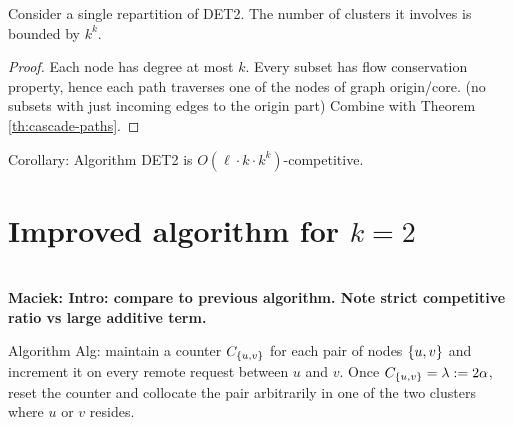 \documentclass[manuscript,screen=true, review, anonymous]{acmart}
\DeclarePairedDelimiter\set{\{}{\}}
\newcommand\maciek[1]{\color{brown}\textbf{\\ Maciek: #1}\color{black}}
\begin{document}
\begin{theorem}
  Consider a single repartition of DET2.
  The number of clusters it involves is bounded by $k^k$.
  \label{th:cascade}
\end{theorem}

\begin{proof}
  Each node has degree at most $k$.
  Every subset has flow conservation property, hence each path traverses one of the nodes of graph origin/core. (no subsets with just incoming edges to the origin part)
  Combine with Theorem \ref{th:cascade-paths}.

\end{proof}


Corollary: Algorithm DET2 is $O(\ell \cdot k\cdot k^k)$-competitive.



\section{Improved algorithm for $k=2$}

\maciek{Intro: compare to previous algorithm. Note strict competitive ratio vs large additive term.}

Algorithm Alg:
maintain a counter $C_{\set{u,v}}$ for each pair of nodes $\set{u,v}$ and increment it on every remote request between $u$ and $v$.
Once $C_{\set{u,v}} = \lambda:=2\alpha$,
reset the counter and collocate the pair arbitrarily in one of the two clusters where $u$ or $v$ resides.
\end{document}
